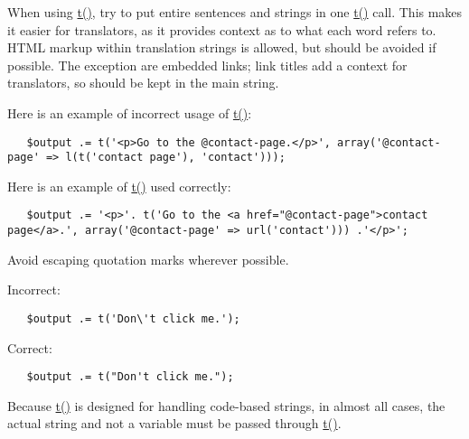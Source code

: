 When using \hyperlink{common_8inc_41d20f0c822bf1f3c26a97981c762665}{t()}, try to put entire sentences and strings in one \hyperlink{common_8inc_41d20f0c822bf1f3c26a97981c762665}{t()} call. This makes it easier for translators, as it provides context as to what each word refers to. HTML markup within translation strings is allowed, but should be avoided if possible. The exception are embedded links; link titles add a context for translators, so should be kept in the main string.

Here is an example of incorrect usage of \hyperlink{common_8inc_41d20f0c822bf1f3c26a97981c762665}{t()}: 

\begin{Code}\begin{verbatim}   $output .= t('<p>Go to the @contact-page.</p>', array('@contact-page' => l(t('contact page'), 'contact')));
\end{verbatim}
\end{Code}



Here is an example of \hyperlink{common_8inc_41d20f0c822bf1f3c26a97981c762665}{t()} used correctly: 

\begin{Code}\begin{verbatim}   $output .= '<p>'. t('Go to the <a href="@contact-page">contact page</a>.', array('@contact-page' => url('contact'))) .'</p>';
\end{verbatim}
\end{Code}



Avoid escaping quotation marks wherever possible.

Incorrect: 

\begin{Code}\begin{verbatim}   $output .= t('Don\'t click me.');
\end{verbatim}
\end{Code}



Correct: 

\begin{Code}\begin{verbatim}   $output .= t("Don't click me.");
\end{verbatim}
\end{Code}



Because \hyperlink{common_8inc_41d20f0c822bf1f3c26a97981c762665}{t()} is designed for handling code-based strings, in almost all cases, the actual string and not a variable must be passed through \hyperlink{common_8inc_41d20f0c822bf1f3c26a97981c762665}{t()}.

